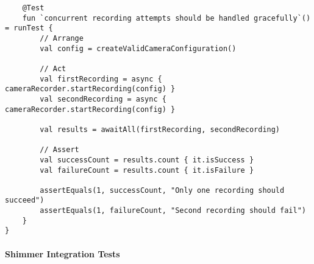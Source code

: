 \documentclass[12pt,a4paper]{report}
\begin{document}
\begin{verbatim}
    @Test
    fun `concurrent recording attempts should be handled gracefully`() = runTest {
        // Arrange
        val config = createValidCameraConfiguration()

        // Act
        val firstRecording = async { cameraRecorder.startRecording(config) }
        val secondRecording = async { cameraRecorder.startRecording(config) }

        val results = awaitAll(firstRecording, secondRecording)

        // Assert
        val successCount = results.count { it.isSuccess }
        val failureCount = results.count { it.isFailure }

        assertEquals(1, successCount, "Only one recording should succeed")
        assertEquals(1, failureCount, "Second recording should fail")
    }
}
\end{verbatim}

\paragraph{Shimmer Integration Tests}
\end{document}
